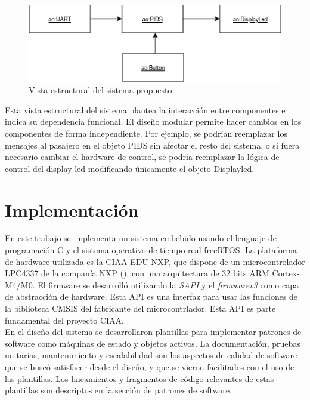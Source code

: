 \begin{figure}[ht]
	\centering
	\includegraphics[width=1\textwidth]{./Figures/diagVistaDisenho.png}
	\caption{Vista estructural del sistema propuesto.}
	\label{fig:diagVistaDisenho}
\end{figure}



Esta vista estructural del sistema plantea la interacción entre componentes e indica su dependencia funcional. El diseño modular permite hacer cambios en los componentes de forma independiente. Por ejemplo, se podrían reemplazar los mensajes al pasajero en el objeto PIDS sin afectar el resto del sistema, o si fuera necesario cambiar el hardware de control, se podría reemplazar la lógica de control del display led modificando únicamente el objeto Displayled.\\


\section{Implementación}
En este trabajo se implementa un sistema embebido usando el lenguaje de programación C y el sistema operativo de tiempo real freeRTOS. La plataforma de hardware utilizada es la CIAA-EDU-NXP, que dispone de un microcontrolador LPC4337 de la companía NXP (\citep{NXPLPC4337}), con una arquitectura de 32 bits ARM Cortex-M4/M0. El firmware se desarrolló utilizando la \textit{SAPI} y el \textit{firmwarev3} \citep{firmwarev3} como capa de abstracción de hardware. Esta API es una interfaz para usar las funciones de la biblioteca CMSIS del fabricante del microcontrlador. Esta API es parte fundamental del proyecto CIAA.\\
 
En el diseño del sistema se desarrollaron plantillas para implementar patrones de software como máquinas de estado y objetos activos. La documentación, pruebas unitarias, mantenimiento y escalabilidad son los aspectos de calidad de software que se buscó satisfacer desde el diseño, y que se vieron facilitados con el uso de las plantillas. Los lineamientos y fragmentos de código relevantes de estas plantillas son descriptos en la sección de patrones de software. \\

